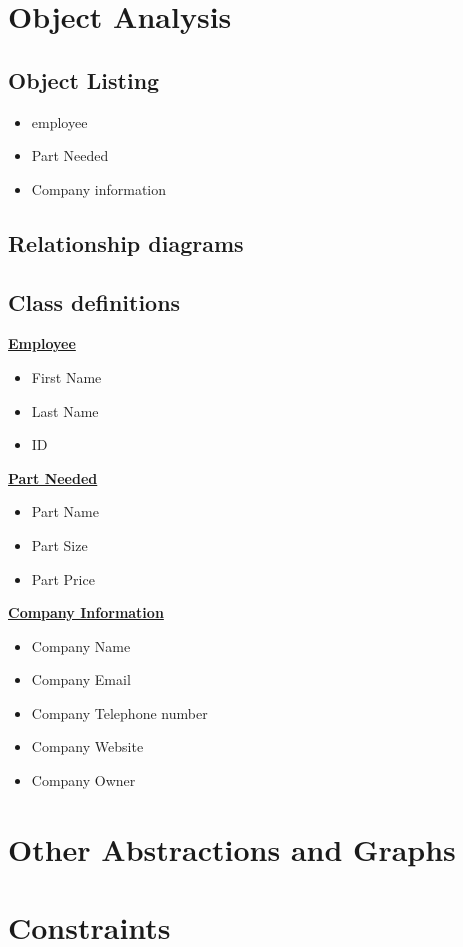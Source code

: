 \section{Object Analysis}

\subsection{Object Listing}
\begin{itemize}
	\item employee
	\item Part Needed
	\item Company information
\end{itemize}

\subsection{Relationship diagrams}

\subsection{Class definitions}
\bf\underline{Employee}
\begin{itemize}
	\item First Name
	\item Last Name
	\item ID 
\end{itemize}
\bf\underline{Part Needed}
\begin{itemize}
	\item Part Name
	\item Part Size
	\item Part Price
\end{itemize}
\bf\underline{Company Information}
\begin{itemize}
	\item Company Name
	\item Company Email
	\item Company Telephone number
	\item Company Website
	\item Company Owner
\end{itemize}
\section{Other Abstractions and Graphs}

\section{Constraints}

